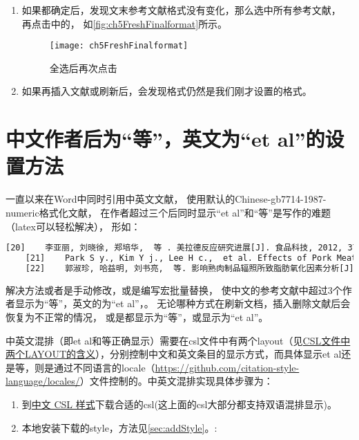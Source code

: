 \documentclass[theorem=false,mathfont=none,openany,sub3section]{easybook}
\begin{document}
{\begin{enumerate}
	\begin{figure}[htbp]
		\centering
		\texttt{[image: ch5Hanging]}
		\caption{设置悬挂缩进}
		\label{fig:ch5Hanging}
	\end{figure}
	\item
	如果都确定后，发现文末参考文献格式没有变化，那么选中所有参考文献，
	再点击中的，
	如\autoref{fig:ch5FreshFinalformat}所示。
	\begin{figure}[htbp]
		\centering
		\texttt{[image: ch5FreshFinalformat]}
		\caption{全选后再次点击}
		\label{fig:ch5FreshFinalformat}
	\end{figure}
	\item
	如果再插入文献或刷新后，会发现格式仍然是我们刚才设置的格式。
\end{enumerate}

\section{中文作者后为“等”，英文为“et al”的设置方法}\label{sec:etal_set}	
一直以来在Word中同时引用中英文文献，
使用默认的Chinese-gb7714-1987-numeric格式化文献，
在作者超过三个后同时显示“et al”和“等”是写作的难题（latex可以轻松解决），
形如：
\begin{lstlisting}[language=HTML]
	[20]	李亚丽, 刘晓徐, 郑培华,  等 . 美拉德反应研究进展[J]. 食品科技, 2012, 37(09): 82–87.
	[21]	Park S y., Kim Y j., Lee H c.,  et al. Effects of Pork Meat Cut and Packaging Type on Lipid Oxidation and Oxidative Products during Refrigerated Storage (8 °C)[J]. Journal of Food Science, 2008, 73(3): C127–C134.
	[22]	郭淑珍, 哈益明, 刘书亮,  等. 影响熟肉制品辐照所致脂肪氧化因素分析[J]. 食品科技, 2006(09): 130–133.
\end{lstlisting}
解决方法或者是手动修改，或是编写宏批量替换，
使中文的参考文献中超过3个作者显示为“等”，英文的为“et al”，。
无论哪种方式在刷新文档，插入删除文献后会恢复为不正常的情况，
或是都显示为“等”，或显示为“et al”。


中英文混排（即et al和等正确显示）需要在csl文件中有两个layout（见\href{https://gitee.com/zotero-chinese/zotero-chinese/issues/I4XKKJ}{CSL文件中两个LAYOUT的含义}），分别控制中文和英文条目的显示方式，而具体显示et al还是等，则是通过不同语言的locale（\url{https://github.com/citation-style-language/locales/}）文件控制的。中英文混排实现具体步骤为：
\begin{enumerate}
	\item 到\href{https://zotero-chinese.com/styles/}{中文 CSL 样式}下载合适的csl(这上面的csl大部分都支持双语混排显示)。
	\item 本地安装下载的style，方法见\cref{sec:addStyle}。:


\end{enumerate}}
\end{document}
